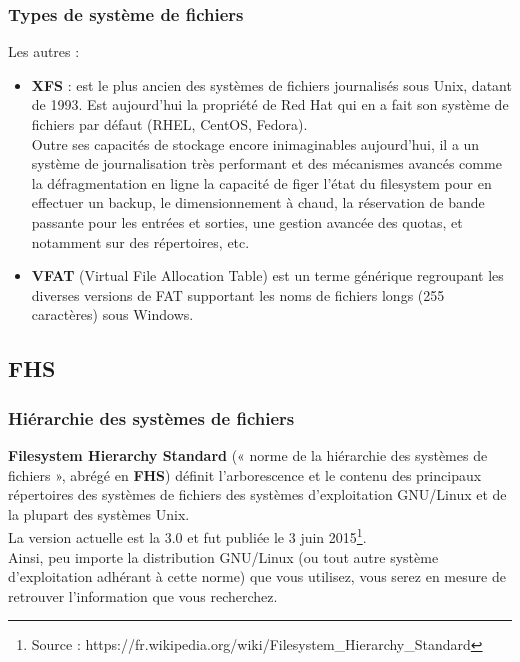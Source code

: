 \begin{frame}[containsverbatim]
	\frametitle{Types de système de fichiers}
	Les autres : 
	\begin{itemize}
		\item \textbf{XFS} : est le plus ancien des systèmes de fichiers journalisés sous Unix, datant de 1993. Est aujourd’hui la propriété de Red Hat qui en a fait son système de fichiers par défaut (RHEL, CentOS, Fedora). \\
		Outre ses capacités de stockage encore inimaginables aujourd’hui, il a un système de journalisation très performant et des mécanismes avancés comme la défragmentation en ligne la capacité de figer l’état du filesystem pour en effectuer un backup, le dimensionnement à chaud, la réservation de bande passante pour les entrées et sorties, une gestion avancée des quotas, et notamment sur des répertoires, etc.
		\item \textbf{VFAT} (Virtual File Allocation Table) est un terme générique regroupant les diverses versions de FAT supportant les noms de fichiers longs (255 caractères) sous Windows.
	\end{itemize}
\end{frame}
	
	\subsection {FHS}
	\begin{frame}
		\frametitle{Hiérarchie des systèmes de fichiers}
		\textbf{Filesystem Hierarchy Standard} (« norme de la hiérarchie des systèmes de fichiers », abrégé en \textbf{FHS}) définit l'arborescence et le contenu des principaux répertoires des systèmes de fichiers des systèmes d'exploitation GNU/Linux et de la plupart des systèmes Unix.\\
		
		La version actuelle est la 3.0 et fut publiée le 3 juin 2015\footnote{Source : https://fr.wikipedia.org/wiki/Filesystem\_Hierarchy\_Standard}. \\
		
		Ainsi, peu importe la distribution GNU/Linux (ou tout autre système d’exploitation adhérant à cette norme) que vous utilisez, vous serez en mesure de retrouver l’information que vous recherchez. 
	\end{frame}
	
